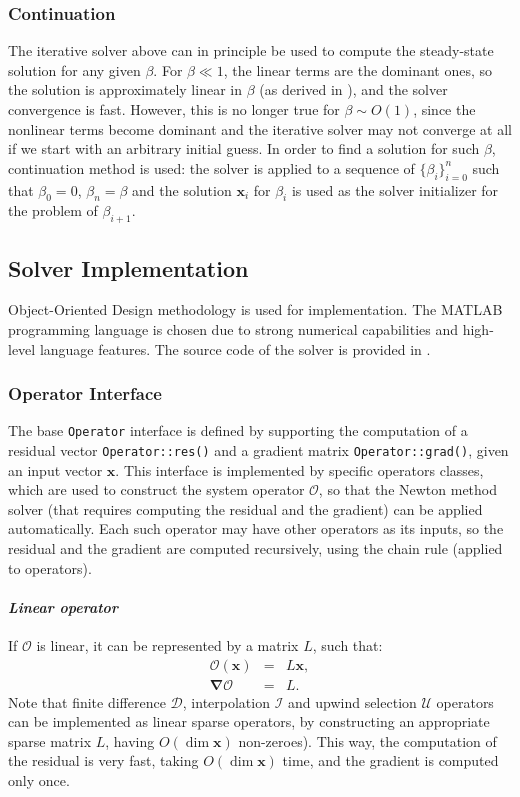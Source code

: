 \documentclass[10pt]{ijnam}
\newcommand\bnabla{\boldsymbol{\nabla}}
\newcommand\bx{\boldsymbol{x}}
\newcommand\cO{\mathcal{O}}
\newcommand\cI{\mathcal{I}}
\newcommand\cD{\mathcal{D}}
\begin{document}
\subsubsection{Continuation}

The iterative solver above can in principle be used 
to compute the steady-state solution for any given $\beta$.
For $\beta \ll 1$, the linear terms are the dominant ones, 
so the solution is approximately linear in $\beta$ 
(as derived in \cite{yariv2010migration}), and the solver convergence is fast.
However, this is no longer true for $\beta \sim O(1)$, since the nonlinear terms become dominant
and the iterative solver may not converge at all if we start with an arbitrary initial guess.
In order to find a solution for such $\beta$, continuation method is used:
the solver is applied to a sequence of $\{\beta_i\}_{i=0}^n$ such that $\beta_0 = 0$,
$\beta_n = \beta$ and the solution $\bx_i$ for $\beta_i$ is used as the solver initializer
for the problem of $\beta_{i+1}$.

\subsection{Solver Implementation}

Object-Oriented Design methodology is used for implementation.
The MATLAB programming language is chosen due to strong numerical capabilities
and high-level language features.
The source code of the solver is provided in \cite{source}.

\subsubsection{Operator Interface}
The base \verb|Operator| interface is defined by 
supporting the computation of a residual vector \verb|Operator::res()|
and a gradient matrix \verb|Operator::grad()|, given an input vector $\bx$.
This interface is implemented by specific operators classes,
which are used to construct the system operator $\cO$, so that 
the Newton method solver (that requires computing the residual and the gradient) 
can be applied automatically.
Each such operator may have other operators as its inputs, so the residual
and the gradient are computed recursively, using the chain rule (applied to operators).

\paragraph{\textit{Linear operator}}
If $\cO$ is linear, it can be represented by a matrix $L$, such that:
\begin{eqnarray*}
\cO(\bx) &=& L \bx, \\
\bnabla\cO &=& L. 
\end{eqnarray*}
Note that finite difference $\cD$, interpolation $\cI$ and 
upwind selection $\mathcal{U}$ operators
can be implemented as linear sparse operators, by constructing 
an appropriate sparse matrix $L$, having $O(\dim \bx)$ non-zeroes).
This way, the computation of the residual is very fast, taking $O(\dim \bx)$ time,
and the gradient is computed only once.
\end{document}
